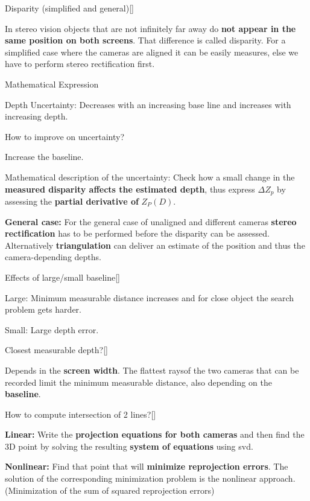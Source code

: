 \documentclass[10pt,a4paper]{scrartcl}
\begin{document}
\begin{multicols*}{2}
\begin{QandA}
{Disparity (simplified and general)}[\Definition]
\item In stereo vision objects that are not infinitely far away do \textbf{not appear in the same position on both screens}. That difference is called disparity. For a simplified case where the cameras are aligned it can be easily measures, else we have to perform stereo rectification first.
\item Mathematical Expression


\item Depth Uncertainty: Decreases with an increasing base line and increases with increasing depth.

\item How to improve on uncertainty?

Increase the baseline.

\item Mathematical description of the uncertainty: Check how a small change in the \textbf{measured disparity affects the estimated depth}, thus express $\Delta Z_p$ by assessing the \textbf{partial derivative of} $Z_P(D)$.

\item \textbf{General case:} For the general case of unaligned and different cameras \textbf{stereo rectification} has to be performed before the disparity can be assessed. Alternatively \textbf{triangulation} can deliver an estimate of the position and thus the camera-depending depths.
\end{QandA}

\begin{QandA}
{Effects of large/small baseline}[\Comparison]
\item Large: Minimum measurable distance increases and for close object the search problem gets harder.
\item Small: Large depth error.
\end{QandA}

\begin{QandA}
{Closest measurable depth?}[\Application]
\item Depends in the \textbf{screen width}. The \glqq flattest rays\grqq of the two cameras that can be recorded limit the minimum measurable distance, also depending on the \textbf{baseline}.
\end{QandA}

\begin{QandA}
{How to compute intersection of 2 lines?}[\Application]
\item \textbf{Linear:} Write the \textbf{projection equations for both cameras} and then find the 3D point by solving the resulting \textbf{system of equations} using svd.
\item \textbf{Nonlinear:} Find that point that will \textbf{minimize reprojection errors}. The solution of the corresponding minimization problem is the nonlinear approach. (Minimization of the sum of squared reprojection errors)
\end{QandA}


\end{multicols*}
\end{document}
